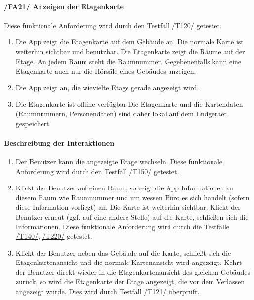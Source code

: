 \paragraph{/FA21/ Anzeigen der Etagenkarte}
\label{/FA21/}
\hfill \break
Diese funktionale Anforderung wird durch den Testfall \hyperref[/T120/]{/T120/} getestet.
\begin{enumerate}
    \item Die App zeigt die \Gls{Etagenkarte} auf dem Gebäude an. Die normale \Gls{Karte} ist weiterhin sichtbar und benutzbar. 
    Die \Gls{Etagenkarte} zeigt die Räume auf der Etage. An jedem Raum steht die Raumnummer.
    Gegebenenfalls kann eine \Gls{Etagenkarte} auch nur die Hörsäle eines Gebäudes anzeigen.
    \item Die App zeigt an, die wievielte Etage gerade angezeigt wird.
    \item Die \Gls{Etagenkarte} ist \gls{offline} verfügbar.Die \Gls{Etagenkarte} und die Kartendaten (Raumnummern, Personendaten) sind daher \gls{lokal} auf dem \Gls{Endgeraet} gespeichert.
\end{enumerate}
\paragraph{Beschreibung der Interaktionen}
\begin{enumerate}[start=22, label=\textbf{/FA\arabic*/}, align=left]
    \item \label{/FA22/} Der \Gls{Benutzer} kann die angezeigte Etage wechseln. Diese funktionale Anforderung wird durch den Testfall \hyperref[/T150/]{/T150/} getestet.
    \item \label{/FA23/} Klickt der \Gls{Benutzer} auf einen Raum, so zeigt die App Informationen zu diesem Raum wie Raumnummer und um wessen Büro es sich handelt (sofern diese Information vorliegt) an. Die \Gls{Karte} ist weiterhin sichtbar. Klickt der \Gls{Benutzer} erneut (ggf. auf eine andere Stelle) auf die \Gls{Karte}, schließen sich die Informationen. Diese funktionale Anforderung wird durch die Testfälle \hyperref[/T140/]{/T140/}, \hyperref[/T220/]{/T220/} getestet.
    \item \label{/FA24/} Klickt der \Gls{Benutzer} neben das Gebäude auf die \Gls{Karte}, schließt sich die \Gls{Etagenkartenansicht} und die normale \Gls{Kartenansicht} wird angezeigt. Kehrt der \Gls{Benutzer} direkt wieder in die \Gls{Etagenkartenansicht} des gleichen Gebäudes zurück, so wird die \Gls{Etagenkarte} der Etage angezeigt, die vor dem Verlassen angezeigt wurde. Dies wird durch Testfall \hyperref[/T121/]{/T121/} überprüft.
\end{enumerate}
